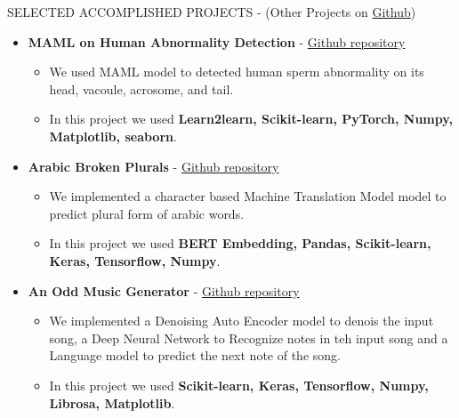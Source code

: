 \documentclass[]{CV}
\begin{document}
\vspace{-4mm}
\begin{section}{SELECTED ACCOMPLISHED PROJECTS { - (Other Projects on \href{https://github.com/amirkasaei}{Github})}}
    \begin{itemize}
\item \textbf{MAML on Human Abnormality Detection} - \href{https://github.com/amirkasaei/Modified-Human-Sperm-Morphology-Analysis}{Github repository}
\begin{itemize}
        \item We used MAML model to detected human sperm abnormality on its head, vacoule, acrosome, and tail. \vspace{-2mm}
        \item In this project we used \textbf{Learn2learn, Scikit-learn, PyTorch, Numpy, Matplotlib, seaborn}.
    \end{itemize}
    
\item \textbf{Arabic Broken Plurals} - \href{https://github.com/amirkasaei/Arabic-Broken-Plurals}{Github repository}
   \begin{itemize}
        \item We implemented a character based Machine Translation Model model to predict plural form of arabic words.\vspace{-2mm}
        \item In this project we used \textbf{BERT Embedding, Pandas, Scikit-learn, Keras, Tensorflow, Numpy}.
    \end{itemize}

\item \textbf{An Odd Music Generator} - \href{https://github.com/amirkasaei/An-Odd-Music-Generator}{Github repository}
   \begin{itemize}
        \item We implemented a Denoising Auto Encoder model to denois the input song, a Deep Neural Network to Recognize notes in teh input song and a Language model to predict the next note of  the song.\vspace{-2mm}
        \item In this project we used \textbf{Scikit-learn, Keras, Tensorflow, Numpy, Librosa, Matplotlib}.
    \end{itemize}


\end{itemize}
\end{section}
\end{document}
